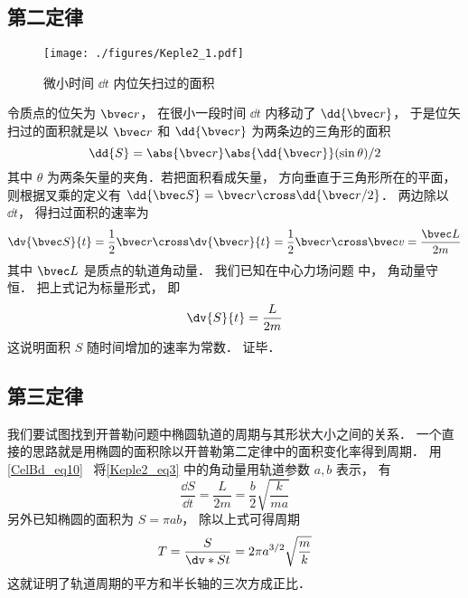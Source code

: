 

\subsection{第二定律}
\begin{figure}[ht]
\centering
\texttt{[image: ./figures/Keple2\_1.pdf]}
\caption{微小时间 $\dd{t}$ 内位矢扫过的面积} \label{Keple2_fig1}
\end{figure}

令质点的位矢为 $\bvec r$，  在很小一段时间 $\dd{t}$ 内移动了 $\dd{\bvec r}$，  于是位矢扫过的面积就是以 $\bvec r$ 和 $\dd{\bvec r}$ 为两条边的三角形的面积
\begin{equation}
\dd{S} = \abs{\bvec r} \abs{\dd{\bvec r}} (\sin \theta) /2
\end{equation}
其中 $\theta$ 为两条矢量的夹角．若把面积看成矢量， 方向垂直于三角形所在的平面， 则根据叉乘的定义有 $\dd{\bvec S} = \bvec r \cross \dd{\bvec r/2}$． 两边除以 $\dd{t}$，  得扫过面积的速率为
\begin{equation}
\dv{\bvec S}{t} = \frac12 \bvec r \cross \dv{\bvec r}{t} = \frac12 \bvec r\cross \bvec v = \frac{\bvec L}{2m}
\end{equation}
其中 $\bvec L$ 是质点的轨道角动量． 我们已知在中心力场问题 中， 角动量守恒． 把上式记为标量形式， 即
\begin{equation}\label{Keple2_eq3}
\dv{S}{t} = \frac{L}{2m}
\end{equation}
这说明面积 $S$ 随时间增加的速率为常数． 证毕．

\subsection{第三定律}
我们要试图找到开普勒问题中椭圆轨道的周期与其形状大小之间的关系． 一个直接的思路就是用椭圆的面积除以开普勒第二定律中的面积变化率得到周期． 用\autoref{CelBd_eq10}~ 将\autoref{Keple2_eq3} 中的角动量用轨道参数 $a,b$ 表示， 有
\begin{equation}
\frac{\dd{S}}{\dd{t}} = \frac{L}{2m} = \frac b2 \sqrt{\frac{k}{ma}}
\end{equation}
另外已知椭圆的面积为 $S = \pi ab$， 除以上式可得周期
\begin{equation}
T = \frac{S}{\dv*{S}{t}} = 2\pi a^{3/2} \sqrt{\frac mk}
\end{equation}
这就证明了轨道周期的平方和半长轴的三次方成正比．